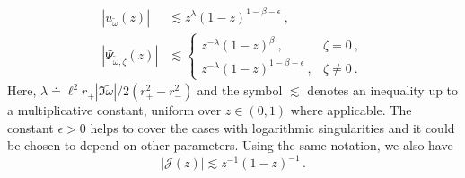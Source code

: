 \documentclass[aps, prd, amsmath, floats, floatfix, twocolumn, nofootinbib, superscriptaddress, showpacs]{revtex4-1}
\def\cJ{\mathcal{J}}
\def\tomega{{\tilde{\omega}}}
\begin{document}
\begin{subequations} \label{eq:estimates}
	\begin{align}
	|u_\tomega(z)| &\lesssim
	z^{\lambda} (1-z)^{1-\beta-\epsilon} \ , \\
	|\Psi_{\tomega,\zeta}(z)| &\lesssim
	\begin{cases}
	z^{-\lambda} (1-z)^{\beta} \ , & \zeta=0 \ , \\
	z^{-\lambda} (1-z)^{1-\beta-\epsilon} \ , & \zeta\ne0 \ .
	\end{cases}
	\end{align}
\end{subequations}
Here, $\lambda \doteq \ell^2 r_+ \left|\Im\tomega\right| / 2(r_+^2-r_-^2)$ and the symbol $\lesssim$ denotes an
inequality up to a multiplicative constant, uniform over $z\in (0,1)$
where applicable. The constant $\epsilon > 0$ helps to cover the cases with
logarithmic singularities and it could be chosen to depend on other
parameters. Using the same notation, we also have
\begin{equation}
|\cJ(z)| \lesssim z^{-1} (1-z)^{-1} \, .
\end{equation}
\end{document}
